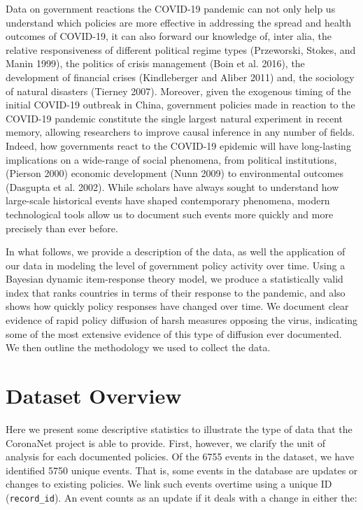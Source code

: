 \documentclass[]{article}
\begin{document}
Data on government reactions the COVID-19 pandemic can not only help us understand which policies are more effective in addressing the spread and health outcomes of COVID-19, it can also forward our knowledge of, inter alia, the relative responsiveness of different political regime types (Przeworski, Stokes, and Manin 1999), the politics of crisis management (Boin et al. 2016), the development of financial crises (Kindleberger and Aliber 2011) and, the sociology of natural disasters (Tierney 2007). Moreover, given the exogenous timing of the initial COVID-19 outbreak in China, government policies made in reaction to the COVID-19 pandemic constitute the single largest natural experiment in recent memory, allowing researchers to improve causal inference in any number of fields. Indeed, how governments react to the COVID-19 epidemic will have long-lasting implications on a wide-range of social phenomena, from political institutions, (Pierson 2000) economic development (Nunn 2009) to environmental outcomes (Dasgupta et al. 2002). While scholars have always sought to understand how large-scale historical events have shaped contemporary phenomena, modern technological tools allow us to document such events more quickly and more precisely than ever before.

In what follows, we provide a description of the data, as well the application of our data in modeling the level of government policy activity over time. Using a Bayesian dynamic item-response theory model, we produce a statistically valid index that ranks countries in terms of their response to the pandemic, and also shows how quickly policy responses have changed over time. We document clear evidence of rapid policy diffusion of harsh measures opposing the virus, indicating some of the most extensive evidence of this type of diffusion ever documented. We then outline the methodology we used to collect the data.

\hypertarget{dataset-overview}{%
\section{Dataset Overview}\label{dataset-overview}}

Here we present some descriptive statistics to illustrate the type of data that the CoronaNet project is able to provide. First, however, we clarify the unit of analysis for each documented policies. Of the 6755 events in the dataset, we have identified 5750 unique events. That is, some events in the database are updates or changes to existing policies. We link such events overtime using a unique ID (\texttt{record\_id}). An event counts as an update if it deals with a change in either the:
\end{document}
